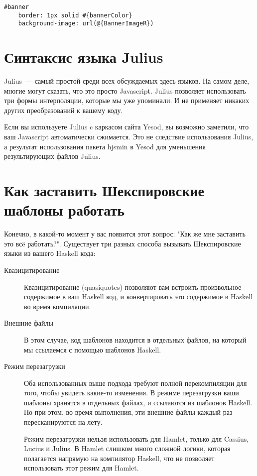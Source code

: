 \begin{lstlisting}
#banner
    border: 1px solid #{bannerColor}
    background-image: url(@{BannerImageR})
\end{lstlisting}

\section{Синтаксис языка Julius}

Julius~--- самый простой среди всех обсуждаемых здесь языков. На самом деле,
многие могут сказать, что это просто Javascript. Julius позволяет использовать
три формы интерполяции, которые мы уже упоминали.  И не применяет никаких
других преобразований к вашему коду.

\begin{remark}
    Если вы используете Julius c каркасом сайта Yesod, вы возможно заметили,
    что ваш Javascript автоматически сжимается. Это не следствие использования
    Julius, а результат использования пакета hjsmin в Yesod для уменьшения
    результирующих файлов Julius.
\end{remark}

\section{Как заставить Шекспировские шаблоны работать}

Конечно, в какой-то момент у вас появится этот вопрос: "Как же мне заставить
это всë работать?". Существует три разных способа вызывать Шекспировские языки
из вашего Haskell кода:

\begin{description}
    \item[Квазицитирование] \hfill
    Квазицитирование (quasiquotes) позволяют вам встроить произвольное
    содержимое в ваш Haskell код, и конвертировать это содержимое в Haskell во
    время компиляции.

    \item[Внешние файлы] \hfill
    В этом случае, код шаблонов находится в отдельных файлов, на который мы
    ссылаемся с помощью шаблонов Haskell.

    \item[Режим перезагрузки] \hfill
    Оба использованных выше подхода требуют полной перекомпиляции для того,
    чтобы увидеть какие-то изменения. В режиме перезагрузки ваши шаблоны
    хранятся в отдельных файлах, и ссылаются из шаблонов Haskell. Но при этом,
    во время выполнения, эти внешние файлы каждый раз пересканируются на лету.

    \begin{remark}
        Режим перезагрузки нельзя использовать для Hamlet, только для Cassius,
        Lucius и Julius.  В Hamlet слишком много сложной логики, которая полагается
        напрямую на компилятор Haskell, что не позволяет использовать этот режим
        для Hamlet.
    \end{remark}
\end{description}

